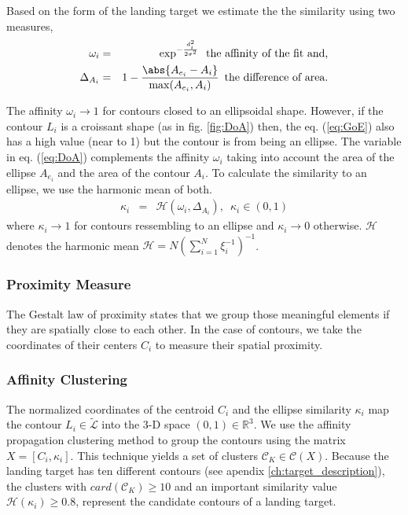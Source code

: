 Based on the form of the landing target we estimate the the similarity using two measures, 
\begin{eqnarray}
\omega_{i}&=&\exp^{-\frac{d_{i}^{2}}{2\sigma^{2}}}\enspace \mbox{the affinity of the fit and,}\label{eq:GoE}\\
\Delta_{A_{i}}&=& 1-\frac{\abs{ A_{e_{i}}-A_{i}}}{\max(A_{e_{i}},A_{i})} \enspace \mbox{the difference of area.}\label{eq:DoA}
\end{eqnarray}

The affinity $\omega_{i}\rightarrow 1$ for contours closed to an ellipsoidal shape. However, if the contour $L_{i}$ is a croissant shape (as in fig. \ref{fig:DoA}) then, the eq. (\ref{eq:GoE}) also has a high value (near to 1) but the contour is from being an ellipse. The variable in eq. (\ref{eq:DoA}) complements the affinity $\omega_{i}$ taking into account the area of the ellipse $A_{e_{i}}$ and the area of the contour $A_{i}$. To calculate the similarity to an ellipse, we use the harmonic mean of both. 
\begin{eqnarray}
\kappa_{i}&=&\mathcal{H}(\omega_{i}, \Delta_{A_{i}}), \enspace \kappa_{i}\in (0,1)\label{eq:similarity}
\end{eqnarray}
where $\kappa_{i}\rightarrow 1$ for contours ressembling to an ellipse and $\kappa_{i}\rightarrow 0$ otherwise. $\mathcal{H}$ denotes the harmonic mean $\mathcal{H}= N \left(\sum\limits_{i=1}^{N} \xi_{i}^{-1} \right)^{-1}$.

\subsubsection{Proximity Measure}\label{subsec:proximity}
The Gestalt law of proximity states that we group those meaningful elements if they are spatially close to each other. In the case of contours, we take the coordinates of their centers $C_{i}$ to measure their spatial proximity.

\subsubsection{Affinity Clustering}\label{subsec:clustering}
The normalized coordinates of the centroid $C_i$ and the ellipse similarity $\kappa_i$ map the contour $L_i\in \widetilde{\mathcal{L}}$ into the 3-D space $(0,1) \in \mathbb{R}^3$. We use the affinity propagation clustering method \citep{Frey.Dueck:SCIENCE:2017} to group the contours using the matrix $X=[C_{i}, \kappa_{i}]$. This technique yields a set of clusters $\mathcal{C}_{K}\in \mathcal{C}(X)$. Because the landing target has ten different contours (see apendix \ref{ch:target_description}), the clusters with $card(\mathcal{C}_{K})\geq 10$ and an important similarity value $\mathcal{H}(\kappa_{i})\geq 0.8$, represent the candidate contours of a landing target.

